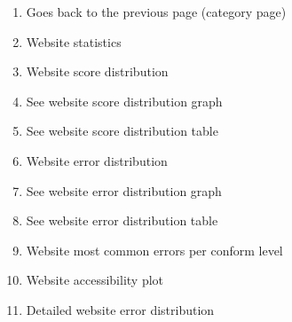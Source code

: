 \begin{enumerate}
    \item Goes back to the previous page (category page)
    \item Website statistics
    \item Website score distribution
    \item See website score distribution graph
    \item See website score distribution table
    \item Website error distribution
    \item See website error distribution graph
    \item See website error distribution table
    \item Website most common errors per conform level
    \item Website accessibility plot
    \item Detailed website error distribution
\end{enumerate}